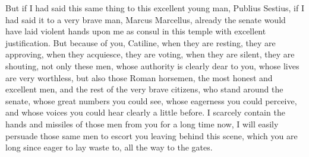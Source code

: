 {  But if I had said this same thing to this excellent young man, Publius Sestius, if I had said it to a very brave man, Marcus Marcellus, already the senate would have laid violent hands upon me as consul in this temple with excellent justification. But because of you, Catiline, when they are resting, they are approving, when they acquiesce, they are voting, when they are silent, they are shouting, not only these men, whose authority is clearly dear to you, whose lives are very worthless, but also those Roman horsemen, the most honest and excellent men, and the rest of the very brave citizens, who stand around the senate, whose great numbers you could see, whose eagerness you could perceive, and whose voices you could hear clearly a little before. I scarcely contain the hands and missiles of those men from you for a long time now, I will easily persuade those same men to escort you leaving behind this scene, which you are long since eager to lay waste to, all the way to the gates.
}
